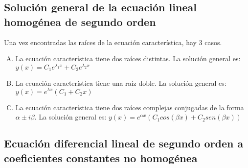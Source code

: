 \documentclass{report}
\begin{document}
\subsection{Solución general de la ecuación lineal homogénea de segundo orden}
Una vez encontradas las raíces de la ecuación característica, hay 3 casos.
\begin{enumerate}[A)]
	\item La ecuación característica tiene dos raíces distintas. La solución general es: $y(x)=C_1e^{\lambda_1 x}+C_2e^{\lambda_2 x}$
	\item La ecuación característica tiene una raíz doble. La solución general es: $y(x)=e^{\lambda x}(C_1+C_2 x)$
	\item La ecuación característica tiene dos raíces complejas conjugadas de la forma $\alpha\pm i\beta$. La solución general es: $y(x)=e^{\alpha x}(C_1 cos(\beta x)+C_2 sen(\beta x))$
\end{enumerate}
\subsection{Ecuación diferencial lineal de segundo orden a coeficientes constantes no homogénea}
\newpage
\end{document}

